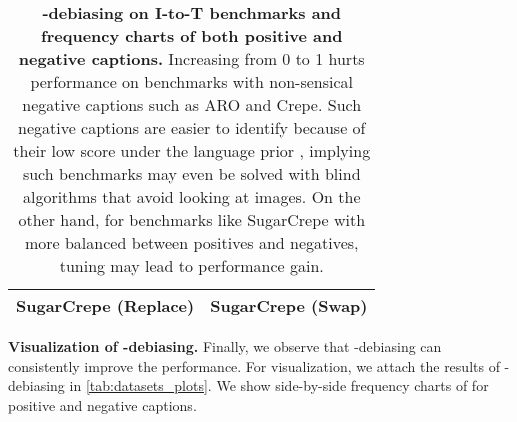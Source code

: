 \documentclass{article} \usepackage{iclr2024_conference,times}
\begin{document}
\begin{table}[h]
{\begin{tabular}{cc|cc}
\multicolumn{2}{c}{SugarCrepe (Replace)} & \multicolumn{2}{c}{SugarCrepe (Swap)} \\
\bottomrule
\end{tabular}
}
\caption{\small {\bf -debiasing on I-to-T benchmarks and  frequency charts of both positive and negative captions.} Increasing  from 0 to 1 hurts performance
on benchmarks with non-sensical negative captions such as ARO and Crepe. Such negative captions are easier to identify because of their low score under the language prior  , implying such benchmarks may even be solved with blind algorithms that avoid looking at images. On the other hand, for benchmarks like SugarCrepe with more balanced  between positives and negatives, tuning  may lead to performance gain.
}
\label{tab:datasets_plots}
\end{table}

{\bf Visualization of -debiasing.} Finally, we observe that -debiasing can consistently improve the performance. For visualization, we attach the results of -debiasing in \autoref{tab:datasets_plots}. We show side-by-side frequency charts of  for positive and negative captions. 
\end{document}
